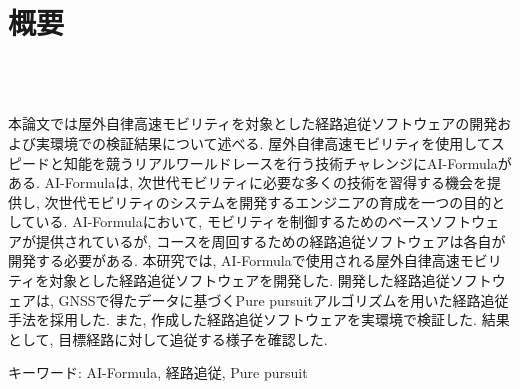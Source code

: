 \chapter*{概要}
\thispagestyle{empty}
%
\begin{center}
  \centering
  \scalebox{1.5}{屋外自律高速モビリティを対象とした}\\
  \scalebox{1.5}{経路追従ソフトウェアの開発}\\
\end{center}
\vspace{1.0zh}
%

%
本論文では屋外自律高速モビリティを対象とした経路追従ソフトウェアの開発および実環境での検証結果について述べる.
屋外自律高速モビリティを使用してスピードと知能を競うリアルワールドレースを行う技術チャレンジにAI-Formulaがある.
AI-Formulaは, 次世代モビリティに必要な多くの技術を習得する機会を提供し, 次世代モビリティのシステムを開発するエンジニアの育成を一つの目的としている.
AI-Formulaにおいて, モビリティを制御するためのベースソフトウェアが提供されているが, コースを周回するための経路追従ソフトウェアは各自が開発する必要がある.
本研究では, AI-Formulaで使用される屋外自律高速モビリティを対象とした経路追従ソフトウェアを開発した.
開発した経路追従ソフトウェアは, GNSSで得たデータに基づくPure pursuitアルゴリズムを用いた経路追従手法を採用した.
また, 作成した経路追従ソフトウェアを実環境で検証した.
結果として, 目標経路に対して追従する様子を確認した.
%
%
%
%
%
%
%
%
%
%
%
%
%

\vspace{2.0zh}

キーワード: AI-Formula, 経路追従, Pure pursuit
%

\newpage
